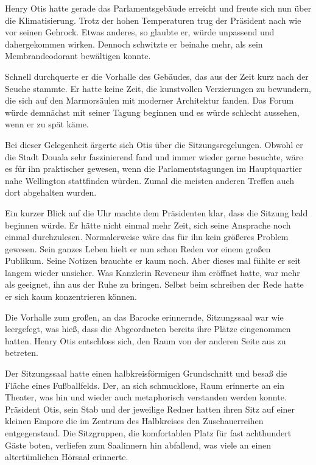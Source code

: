 Henry Otis hatte gerade das Parlamentsgebäude erreicht und freute sich nun über die Klimatisierung.
Trotz der hohen Temperaturen trug der Präsident nach wie vor seinen Gehrock.
Etwas anderes, so glaubte er, würde unpassend und dahergekommen wirken.
Dennoch schwitzte er beinahe mehr, als sein Membrandeodorant bewältigen konnte.

\par

Schnell durchquerte er die Vorhalle des Gebäudes, das aus der Zeit kurz nach der Seuche stammte.
Er hatte keine Zeit, die kunstvollen Verzierungen zu bewundern, die sich auf den Marmorsäulen mit moderner Architektur fanden.
Das Forum würde demnächst mit seiner Tagung beginnen und es würde schlecht aussehen, wenn er zu spät käme.

\par

Bei dieser Gelegenheit ärgerte sich Otis über die Sitzungsregelungen.
Obwohl er die Stadt Douala sehr faszinierend fand und immer wieder gerne besuchte, wäre es für ihn praktischer gewesen, wenn die Parlamentstagungen im Hauptquartier nahe Wellington stattfinden würden.
Zumal die meisten anderen Treffen auch dort abgehalten wurden.

\par

Ein kurzer Blick auf die Uhr machte dem Präsidenten klar, dass die Sitzung bald beginnen würde.
Er hätte nicht einmal mehr Zeit, sich seine Ansprache noch einmal durchzulesen.
Normalerweise wäre das für ihn kein größeres Problem gewesen.
Sein ganzes Leben hielt er nun schon Reden vor einem großen Publikum.
Seine Notizen brauchte er kaum noch.
Aber dieses mal fühlte er seit langem wieder unsicher.
Was Kanzlerin Reveneur ihm eröffnet hatte, war mehr als geeignet, ihn aus der Ruhe zu bringen.
Selbst beim schreiben der Rede hatte er sich kaum konzentrieren können.

\par

Die Vorhalle zum großen, an das Barocke erinnernde, Sitzungssaal war wie leergefegt, was hieß, dass die Abgeordneten bereits ihre Plätze eingenommen hatten.
Henry Otis entschloss sich, den Raum von der anderen Seite aus zu betreten.

\par

Der Sitzungssaal hatte einen halbkreisförmigen Grundschnitt und besaß die Fläche eines Fußballfelds.
Der, an sich schmucklose, Raum erinnerte an ein Theater, was hin und wieder auch metaphorisch verstanden werden konnte.
Präsident Otis, sein Stab und der jeweilige Redner hatten ihren Sitz auf einer kleinen Empore die im Zentrum des Halbkreises den Zuschauerreihen entgegenstand.
Die Sitzgruppen, die komfortablen Platz für fast achthundert Gäste boten, verliefen zum Saalinnern hin abfallend, was viele an einen altertümlichen Hörsaal erinnerte.

